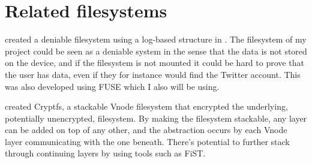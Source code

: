 \section{Related filesystems}
\citeauthor{petersDEFYDeniableFile2014} created a deniable filesystem using a log-based structure in \citeyear{petersDEFYDeniableFile2014}\cite{petersDEFYDeniableFile2014}. The filesystem of my project could be seen as a deniable system in the sense that the data is not stored on the device, and if the filesystem is not mounted it could be hard to prove that the user has data, even if they for instance would find the Twitter account. This was also developed using FUSE\cite{Libfuse2021} which I also will be using.

\citeauthor{zadokCryptfsStackableVnode} created Cryptfs, a stackable Vnode filesystem that encrypted the underlying, potentially unencrypted, filesystem\cite{zadokCryptfsStackableVnode}. By making the filesystem stackable, any layer can be added on top of any other, and the abstraction occurs by each Vnode layer communicating with the one beneath. There's potential to further stack through continuing layers by using tools such as FiST\cite{FiSTStackableFile}.